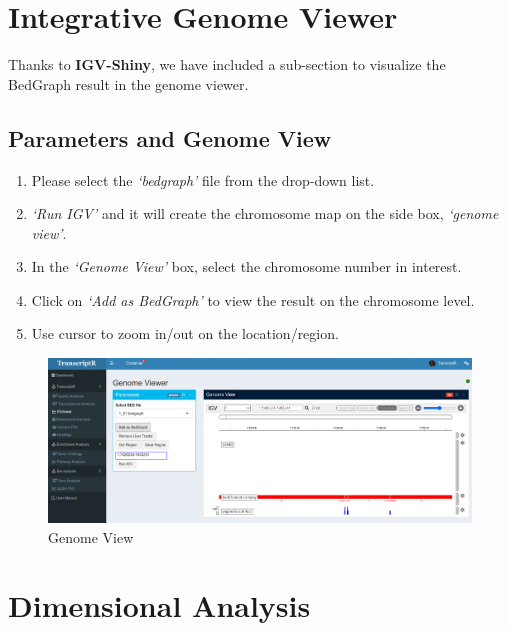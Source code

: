 \documentclass[
  a4paper,
  oneside,
  open=any]{scrreport}
\providecommand{\tightlist}{%
  \setlength{\itemsep}{0pt}\setlength{\parskip}{0pt}}\usepackage{longtable,booktabs,array}
\begin{document}
\hypertarget{integrative-genome-viewer}{%
\chapter{Integrative Genome Viewer}\label{integrative-genome-viewer}}

Thanks to \textbf{IGV-Shiny}, we have included a sub-section to
visualize the BedGraph result in the genome viewer.

\hypertarget{parameters-and-genome-view}{%
\section{Parameters and Genome View}\label{parameters-and-genome-view}}

\begin{enumerate}
\def\labelenumi{\arabic{enumi}.}
\tightlist
\item
  Please select the \emph{`bedgraph'} file from the drop-down list.
\item
  \emph{`Run IGV'} and it will create the chromosome map on the side
  box, \emph{`genome view'}.
\item
  In the \emph{`Genome View'} box, select the chromosome number in
  interest.
\item
  Click on \emph{`Add as BedGraph'} to view the result on the chromosome
  level.
\item
  Use cursor to zoom in/out on the location/region.
\end{enumerate}

\begin{figure}[H]

{\centering \includegraphics{./_images/igv/igv1.png}

}

\caption{\label{fig-igv1}Genome View}

\end{figure}

\hypertarget{sec-multid}{%
\chapter{Dimensional Analysis}\label{sec-multid}}
\end{document}
